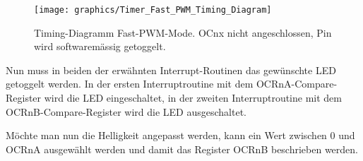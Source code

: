 \begin{figure}[H]
	\centering
	\texttt{[image: graphics/Timer\_Fast\_PWM\_Timing\_Diagram]}
	\caption{Timing-Diagramm Fast-PWM-Mode. OCnx nicht angeschlossen, Pin wird softwaremässig getoggelt.\cite[S.147]{atmel_atmel_2014}}
	\label{fig:Timer_Fast_PWM_Timing_Diagram}
\end{figure}

Nun muss in beiden der erwähnten Interrupt-Routinen das gewünschte LED getoggelt werden. In der ersten Interruptroutine mit dem OCRnA-Compare-Register wird die LED eingeschaltet, in der zweiten Interruptroutine mit dem OCRnB-Compare-Register wird die LED ausgeschaltet.

Möchte man nun die Helligkeit angepasst werden, kann ein Wert zwischen 0 und OCRnA ausgewählt werden und damit das Register OCRnB beschrieben werden.

%
%
%
%
%
%
